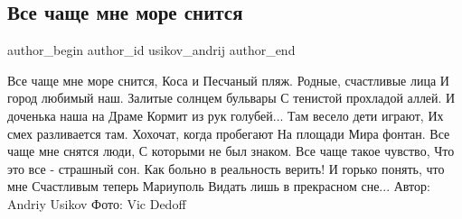  
 
 
 
 
 
\subsection{Все чаще мне море снится}
\label{sec:29_05_2022.fb.usikov_andrij.1.more_mariupol}
 
\ifcmt
 author_begin
   author_id usikov_andrij
 author_end
\fi

\raggedcolumns
\begin{multicols}{2} %
\setlength{\parindent}{0pt}

\Large
\obeycr
Все чаще мне море снится,
Коса и Песчаный пляж.
Родные, счастливые лица
И город любимый наш.
\smallskip
Залитые солнцем бульвары
С тенистой прохладой аллей.
И доченька наша на Драме
Кормит из рук голубей...
\smallskip
Там весело дети играют,
Их смех разливается там.
Хохочат, когда пробегают
На площади Мира фонтан.
\smallskip
Все чаще мне снятся люди,
С которыми не был знаком.
Все чаще такое чувство,
Что это все - страшный сон.
\smallskip
Как больно в реальность верить!
И горько понять, что мне
Счастливым теперь Мариуполь
Видать лишь в прекрасном сне...
\smallskip
Автор: Andriy Usikov 
\smallskip
Фото: Vic Dedoff
\restorecr

\end{multicols} %



